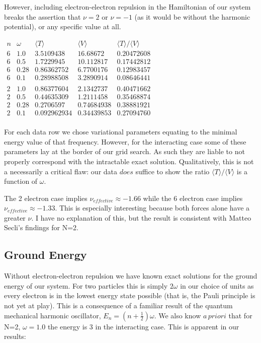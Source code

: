 \documentclass[11pt, conference, compsocconf]{IEEEtran}
\begin{document}
However, including electron-electron repulsion in the Hamiltonian of our system breaks the assertion that $\nu=2$ or $\nu=-1$ (as it would be without the harmonic potential), or any specific value at all.  

$\begin{array}{ccccc}
n & \omega & \langle T\rangle & \langle V\rangle & \langle T\rangle / \langle V\rangle \\
6 & 1.0  & 3.5109438  &  16.68672    &  0.20472608\\
6 & 0.5  & 1.7229945  &  10.112817   &  0.17442812\\
6 & 0.28 &  0.86362752  &  6.7700176 &  0.12983457 \\
6 & 0.1  & 0.28988508  &  3.2890914  &  0.08646441 \\ 
 & & & & \\
2 & 1.0  & 0.86377604  &  2.1342737  &  0.40471662\\
2 & 0.5  & 0.44635309  &  1.2111458  &  0.35468874  \\
2 & 0.28 & 0.2706597  &  0.74684938  &  0.38881921\\
2 & 0.1  & 0.092962934 & 0.34439853  &  0.27094760 \\
\end{array}$

For each data row we chose variational parameters equating to the minimal energy value of that frequency. However, for the interacting case some of these parameters lay at the border of our grid search. As such they are liable to not properly correspond with the intractable exact solution. Qualitatively, this is not a necessarily a critical flaw: our data $does$ suffice to show the ratio $\langle T\rangle / \langle V\rangle$ is a function of $\omega$. 

The 2 electron case implies $\nu_{effective} \approx -1.66$ while the 6 electron case implies  $\nu_{effective} \approx -1.33$. This is especially interesting because both forces alone have a greater $\nu$. I have no explanation of this, but the result is consistent with Matteo Secli's findings for N=2.


\subsection{Ground Energy}
Without electron-electron repulsion we have known exact solutions for the ground energy of our system. For two particles this is simply $2\omega$ in our choice of units as every electron is in the lowest energy state possible (that is, the Pauli principle is not yet at play). This is a consequence of a familiar result of the quantum mechanical harmonic oscillator, $E_n = \left(n+\frac{1}{2}\right)\omega$. We also know $a\,priori$ that for N=2, $\omega=1.0$ the energy is 3 in the interacting case. This is apparent in our results:
\end{document}

